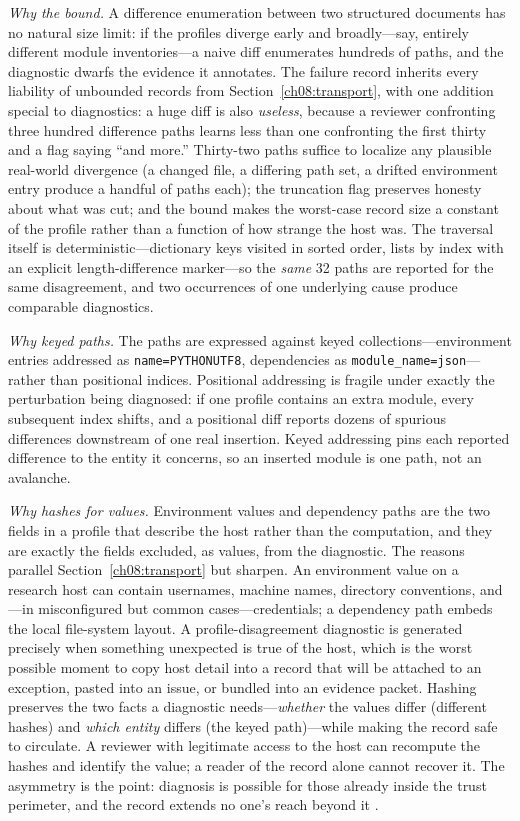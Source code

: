 \emph{Why the bound.} A difference enumeration between two structured documents has no natural size limit: if the profiles diverge early and broadly---say, entirely different module inventories---a naive diff enumerates hundreds of paths, and the diagnostic dwarfs the evidence it annotates. The failure record inherits every liability of unbounded records from Section~\ref{ch08:transport}, with one addition special to diagnostics: a huge diff is also \emph{useless}, because a reviewer confronting three hundred difference paths learns less than one confronting the first thirty and a flag saying ``and more.'' Thirty-two paths suffice to localize any plausible real-world divergence (a changed file, a differing path set, a drifted environment entry produce a handful of paths each); the truncation flag preserves honesty about what was cut; and the bound makes the worst-case record size a constant of the profile rather than a function of how strange the host was. The traversal itself is deterministic---dictionary keys visited in sorted order, lists by index with an explicit length-difference marker---so the \emph{same} 32 paths are reported for the same disagreement, and two occurrences of one underlying cause produce comparable diagnostics.

\emph{Why keyed paths.} The paths are expressed against keyed collections---environment entries addressed as \texttt{name=PYTHONUTF8}, dependencies as \texttt{module\_name=json}---rather than positional indices. Positional addressing is fragile under exactly the perturbation being diagnosed: if one profile contains an extra module, every subsequent index shifts, and a positional diff reports dozens of spurious differences downstream of one real insertion. Keyed addressing pins each reported difference to the entity it concerns, so an inserted module is one path, not an avalanche.

\emph{Why hashes for values.} Environment values and dependency paths are the two fields in a profile that describe the host rather than the computation, and they are exactly the fields excluded, as values, from the diagnostic. The reasons parallel Section~\ref{ch08:transport} but sharpen. An environment value on a research host can contain usernames, machine names, directory conventions, and---in misconfigured but common cases---credentials; a dependency path embeds the local file-system layout. A profile-disagreement diagnostic is generated precisely when something unexpected is true of the host, which is the worst possible moment to copy host detail into a record that will be attached to an exception, pasted into an issue, or bundled into an evidence packet. Hashing preserves the two facts a diagnostic needs---\emph{whether} the values differ (different hashes) and \emph{which entity} differs (the keyed path)---while making the record safe to circulate. A reviewer with legitimate access to the host can recompute the hashes and identify the value; a reader of the record alone cannot recover it. The asymmetry is the point: diagnosis is possible for those already inside the trust perimeter, and the record extends no one's reach beyond it \cite{anderson}.

